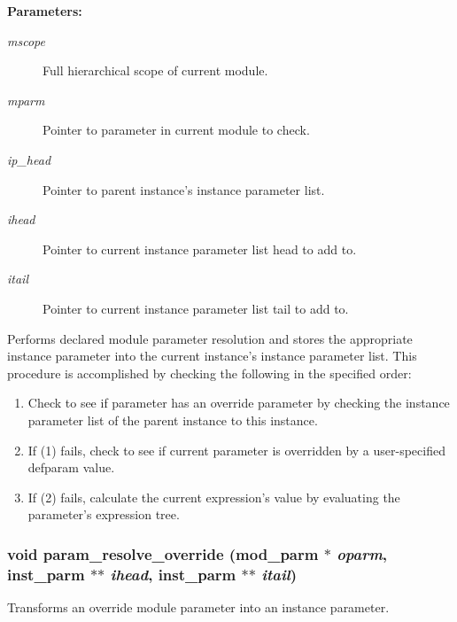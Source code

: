 \begin{Desc}
\item[{\bf Parameters: }]\par
\begin{description}
\item[
{\em mscope}]Full hierarchical scope of current module. \item[
{\em mparm}]Pointer to parameter in current module to check. \item[
{\em ip\_\-head}]Pointer to parent instance's instance parameter list. \item[
{\em ihead}]Pointer to current instance parameter list head to add to. \item[
{\em itail}]Pointer to current instance parameter list tail to add to.

\end{description}
\end{Desc}
Performs declared module parameter resolution and stores the appropriate instance parameter into the current instance's instance parameter list. This procedure is accomplished by checking the following in the specified order:\begin{enumerate}
\item 
Check to see if parameter has an override parameter by checking the instance parameter list of the parent instance to this instance.\item 
If (1) fails, check to see if current parameter is overridden by a user-specified defparam value.\item 
If (2) fails, calculate the current expression's value by evaluating the parameter's expression tree. \end{enumerate}
\subsubsection{\setlength{\rightskip}{0pt plus 5cm}void param\_\-resolve\_\-override ({\bf mod\_\-parm} $\ast$ {\em oparm}, {\bf inst\_\-parm} $\ast$$\ast$ {\em ihead}, {\bf inst\_\-parm} $\ast$$\ast$ {\em itail})}\label{param_8c_a17}


Transforms an override module parameter into an instance parameter.

